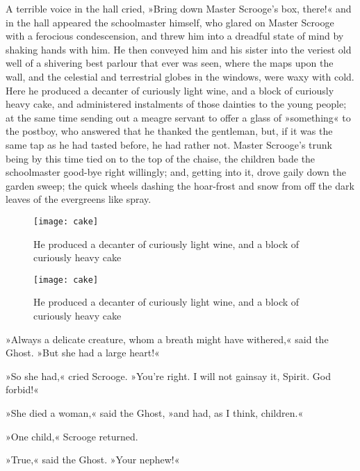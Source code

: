A terrible voice in the hall cried, »Bring down Master Scrooge's box, there!« and in the hall appeared the schoolmaster himself, who glared on Master Scrooge with a ferocious condescension, and threw him into a dreadful state of mind by shaking hands with him. He then conveyed him and his sister into the veriest old well of a shivering best parlour that ever was seen, where the maps upon the wall, and the celestial and terrestrial globes in the windows, were waxy with cold. Here he produced a decanter of curiously light wine, and a block of curiously heavy cake, and administered instalments of those dainties to the young people; at the same time sending out a meagre servant to offer a glass of »something« to the postboy, who answered that he thanked the gentleman, but, if it was the same tap as he had tasted before, he had rather not. Master Scrooge's trunk being by this time tied on to the top of the chaise, the children bade the schoolmaster good-bye right willingly; and, getting into it, drove gaily down the garden sweep; the quick wheels dashing the hoar-frost and snow from off the dark leaves of the evergreens like spray.


\begin{letter}
	\begin{figure}[tbh]
	\centering
	\texttt{[image: cake]}
	\caption[A decanter of curiously light wine]{He produced a decanter of curiously light wine, and a block of curiously heavy cake}
\end{figure}
\end{letter}

\begin{a4}
	\begin{figure}[tbh]
	\centering
	\texttt{[image: cake]}
	\caption[A decanter of curiously light wine]{He produced a decanter of curiously light wine, and a block of curiously heavy cake}
\end{figure}
\end{a4}


»Always a delicate creature, whom a breath might have withered,« said the Ghost. »But she had a large heart!«

»So she had,« cried Scrooge. »You're right. I will not gainsay it, Spirit. God forbid!«

»She died a woman,« said the Ghost, »and had, as I think, children.«

»One child,« Scrooge returned.

»True,« said the Ghost. »Your nephew!«

